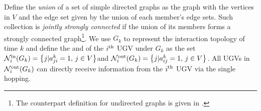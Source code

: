 	Define the \textit{union} of a set of simple directed graphs 
	as the graph with the vertices in $V$ and the edge set given by the union of each member's edge sets.
	Such collection is \textit{jointly strongly connected} if the union of its members forms a strongly connected graph\footnote{\textcolor{\revcol}{The counterpart definition for undirected graphs is given in \cite{jadbabaie2003coordination}.}}.
	We use $G_{k}$ to represent the interaction topology of time $k$ and define the \textit{\inbhd} and \textit{\onbhd} of the $i^\text{th}$ UGV under $G_{k}$ as the set \small$\mathcal{N}^\text{in}_i(G_{k})=\left\lbrace j|a^k_{ji}=1,\,j\in V\right\rbrace $\normalsize and  \small$\mathcal{N}^\text{out}_i(G_{k})=\left\lbrace j|a^k_{ij}=1,\,j\in V\right\rbrace $\normalsize. %
	All UGVs in $\mathcal{N}^\text{out}_i(G_{k})$ can directly receive information from the $i^\text{th}$ UGV via the single hopping.
